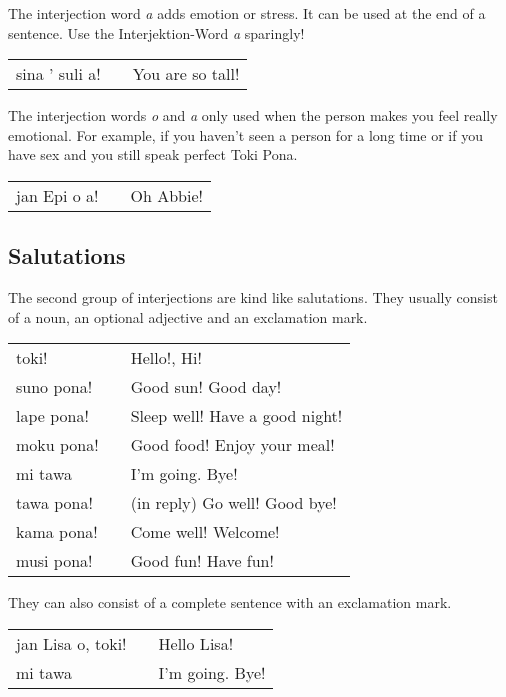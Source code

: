 The interjection word \textit{a} adds emotion or stress. 
It can be used at the end of a sentence.
Use the Interjektion-Word \textit{a} sparingly!

\begin{supertabular}{p{5,5cm}|ll}
sina ' suli a! && You are so tall! \\
\end{supertabular} 

The interjection words \textit{o} and \textit{a} only used when the person makes you feel really emotional. 
For example, if you haven't seen a person for a long time or if you have sex and you still speak perfect Toki Pona. 

\begin{supertabular}{p{5,5cm}|ll}
jan Epi o a! && Oh Abbie! \\
\end{supertabular} 

%
\subsection*{Salutations}
%
%
The second group of interjections are kind like salutations.
They usually consist of a noun, an optional adjective and an exclamation mark. 

\begin{supertabular}{p{5,5cm}|ll}
toki! && Hello!, Hi! \\
suno pona! && Good sun! Good day! \\
lape pona! && Sleep well! Have a good night! \\
moku pona! && Good food! Enjoy your meal! \\
mi tawa && I'm going. Bye! \\
tawa pona! && (in reply) Go well! Good bye! \\
kama pona! && Come well! Welcome! \\
musi pona! && Good fun! Have fun! \\
\end{supertabular}  

They can also consist of a complete sentence with an exclamation mark.

\begin{supertabular}{p{5,5cm}|ll}
jan Lisa o, toki! && Hello Lisa! \\
mi tawa && I'm going. Bye! \\
\end{supertabular}
%
\newpage
%
